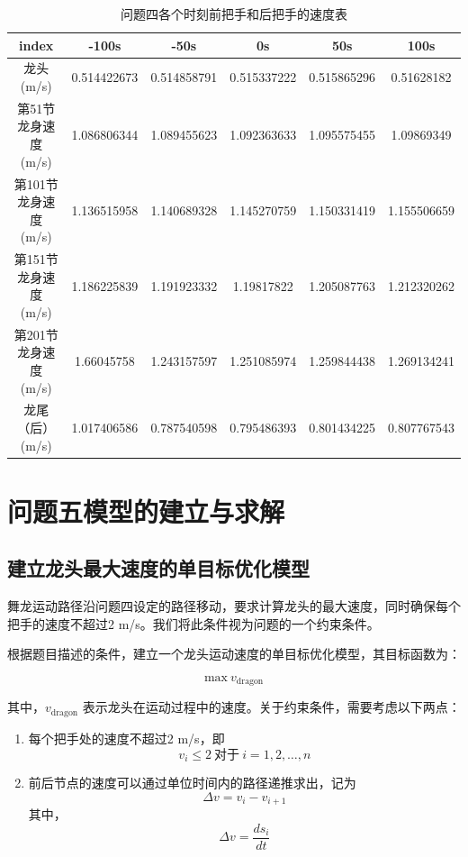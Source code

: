 \documentclass[withoutpreface, bwprint]{cumcmthesis} %
\begin{document}
\begin{table}[]
    \centering
    \caption{问题四各个时刻前把手和后把手的速度表}
    \begin{tabular}{@{}cccccc@{}}
        \toprule
        \textbf{index}  & \textbf{-100s} & \textbf{-50s} & \textbf{0s} & \textbf{50s} & \textbf{100s} \\ \midrule
        龙头 (m/s)        & 0.514422673    & 0.514858791   & 0.515337222 & 0.515865296  & 0.51628182    \\
        第51节龙身速度 (m/s)  & 1.086806344    & 1.089455623   & 1.092363633 & 1.095575455  & 1.09869349    \\
        第101节龙身速度 (m/s) & 1.136515958    & 1.140689328   & 1.145270759 & 1.150331419  & 1.155506659   \\
        第151节龙身速度 (m/s) & 1.186225839    & 1.191923332   & 1.19817822  & 1.205087763  & 1.212320262   \\
        第201节龙身速度 (m/s) & 1.66045758     & 1.243157597   & 1.251085974 & 1.259844438  & 1.269134241   \\
        龙尾（后） (m/s)     & 1.017406586    & 0.787540598   & 0.795486393 & 0.801434225  & 0.807767543   \\ \bottomrule
    \end{tabular}
\end{table}


\section{问题五模型的建立与求解}

\subsection{建立龙头最大速度的单目标优化模型}

舞龙运动路径沿问题四设定的路径移动，要求计算龙头的最大速度，同时确保每个把手的速度不超过2 m/s。我们将此条件视为问题的一个约束条件。

根据题目描述的条件，建立一个龙头运动速度的单目标优化模型，其目标函数为：

\begin{equation}
    \text{max} \ v_{\text{dragon}}
\end{equation}

其中，$v_{\text{dragon}}$ 表示龙头在运动过程中的速度。关于约束条件，需要考虑以下两点：
\begin{enumerate}
    \item 每个把手处的速度不超过2 m/s，即
          \begin{equation}
              v_{i} \leq 2 \ \text{对于} \ i = 1, 2, \dots, n
          \end{equation}
    \item 前后节点的速度可以通过单位时间内的路径递推求出，记为
          \begin{equation}
              \Delta v = v_{i} - v_{i+1}
          \end{equation}
          其中，
          \begin{equation}
              \Delta v = \frac{ds_i}{dt}
          \end{equation}
\end{enumerate}
\end{document}
